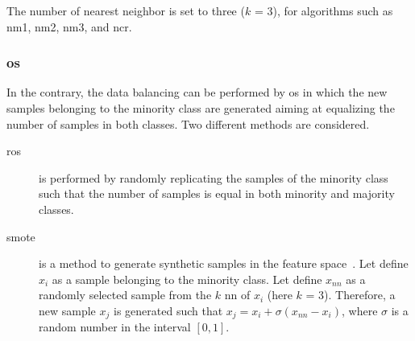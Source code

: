 The number of nearest neighbor is set to three ($k$ = 3), for algorithms such as \ac{nm1}, \ac{nm2}, \ac{nm3}, and \ac{ncr}.
\subsubsection{\acl{os}}

\noindent In the contrary, the data balancing can be performed by \ac{os} in which the new samples belonging to the minority class are generated aiming at equalizing the number of samples in both classes.
Two different methods are considered.

\begin{description}
\item[\Ac{ros}] is performed by randomly replicating the samples of the minority class such that the number of samples is equal in both minority and majority classes.
\end{description}



\begin{description}
\item[\Ac{smote}] is a method to generate synthetic samples in the feature space~\cite{chawla2002smote}.
Let define $x_i$ as a sample belonging to the minority class.
Let define $x_{nn}$ as a randomly selected sample from the $k$ \ac{nn} of $x_i$ (here $k$ = 3).
Therefore, a new sample $x_j$ is generated such that $x_j = x_i + \sigma \left( x_{nn} - x_i \right)$, where $\sigma$ is a random number in the interval $\left[0,1\right]$.
\end{description}

